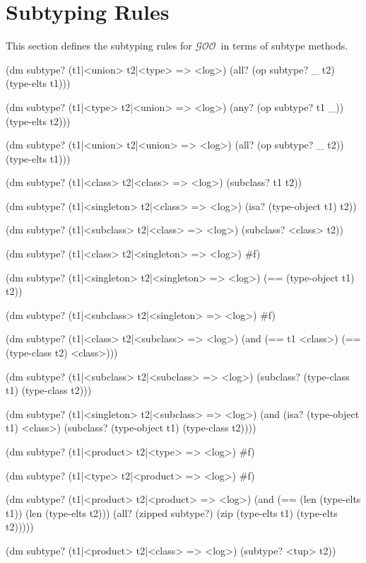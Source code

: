\documentclass[twoside,twocolumn,9pt]{extarticle}
\newcommand{\goo}{$\mathcal{GOO}$}
\begin{document}
\section{Subtyping Rules}
\label{subtyping}

This section defines the subtyping rules for \goo\ in terms of subtype
methods.  

\begin{exv}
(dm subtype? (t1|<union> t2|<type> => <log>)
  (all? (op subtype? _ t2) (type-elts t1)))

(dm subtype? (t1|<type> t2|<union> => <log>)
  (any? (op subtype? t1 _)) (type-elts t2)))

(dm subtype? (t1|<union> t2|<union> => <log>)
  (all? (op subtype? _ t2)) (type-elts t1)))

(dm subtype? (t1|<class> t2|<class> => <log>)
  (subclass? t1 t2))

(dm subtype? (t1|<singleton> t2|<class> => <log>)
  (isa? (type-object t1) t2))

(dm subtype? (t1|<subclass> t2|<class> => <log>)
  (subclass? <class> t2))

(dm subtype? (t1|<class> t2|<singleton> => <log>) #f)

(dm subtype? (t1|<singleton> t2|<singleton> => <log>)
  (== (type-object t1) t2))

(dm subtype? (t1|<subclass> t2|<singleton> => <log>) #f)

(dm subtype? (t1|<class> t2|<subclass> => <log>)
  (and (== t1 <class>) (== (type-class t2) <class>)))

(dm subtype? (t1|<subclass> t2|<subclass> => <log>)
  (subclass? (type-class t1) (type-class t2)))

(dm subtype? (t1|<singleton> t2|<subclass> => <log>)
  (and (isa? (type-object t1) <class>)
       (subclass? (type-object t1) (type-class t2))))

(dm subtype? (t1|<product> t2|<type> => <log>) #f)

(dm subtype? (t1|<type> t2|<product> => <log>) #f)

(dm subtype? (t1|<product> t2|<product> => <log>)
  (and (== (len (type-elts t1)) (len (type-elts t2)))
       (all? (zipped subtype?) (zip (type-elts t1) (type-elts t2)))))

(dm subtype? (t1|<product> t2|<class> => <log>)
  (subtype? <tup> t2))
\end{exv}
\end{document}
